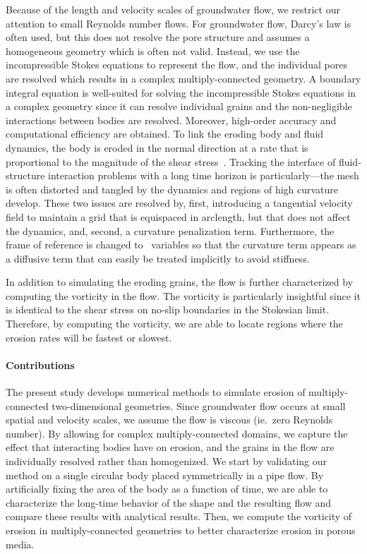 \documentclass[preprint, 10pt]{elsarticle}
\begin{document}
Because of the length and velocity scales of groundwater flow, we
restrict our attention to small Reynolds number flows.  For groundwater
flow, Darcy's law is often used, but this does not resolve the pore
structure and assumes a homogeneous geometry which is often not valid.
Instead, we use the incompressible Stokes equations to represent the
flow, and the individual pores are resolved which results in a complex
multiply-connected geometry.  A boundary integral equation is
well-suited for solving the incompressible Stokes equations in a complex
geometry since it can resolve individual grains and the non-negligible
interactions between bodies are resolved. Moreover, high-order accuracy
and computational efficiency are obtained. To link the eroding body and
fluid dynamics, the body is eroded in the normal direction at a rate
that is proportional to the magnitude of the shear
stress~\cite{ris-moo-chi-she-zha2012}.  Tracking the interface of
fluid-structure interaction problems with a long time horizon is
particularly---the mesh is often distorted and tangled by the dynamics
and regions of high curvature develop.  These two issues are resolved
by, first, introducing a tangential velocity field to maintain a grid
that is equispaced in arclength, but that does not affect the dynamics,
and, second, a curvature penalization term.  Furthermore, the frame of
reference is changed to \thL~variables so that the curvature term
appears as a diffusive term that can easily be treated implicitly
to avoid stiffness.

In addition to simulating the eroding grains, the flow is further
characterized by computing the vorticity in the flow.  The vorticity is
particularly insightful since it is identical to the shear stress on
no-slip boundaries in the Stokesian limit.  Therefore, by computing the
vorticity, we are able to locate regions where the erosion rates will be
fastest or slowest.

\paragraph{Contributions} The present study develops numerical methods
to simulate erosion of multiply-connected two-dimensional geometries.
Since groundwater flow occurs at small spatial and velocity scales, we
assume the flow is viscous (ie.~zero Reynolds number).  By allowing for
complex multiply-connected domains, we capture the effect that
interacting bodies have on erosion, and the grains in the flow are
individually resolved rather than homogenized.  We start by validating
our method on a single circular body placed symmetrically in a pipe
flow.  By artificially fixing the area of the body as a function of
time, we are able to characterize the long-time behavior of the shape
and the resulting flow and compare these results with analytical
results.  Then, we compute the vorticity of erosion in
multiply-connected geometries to better characterize erosion in porous
media. 
\end{document}
